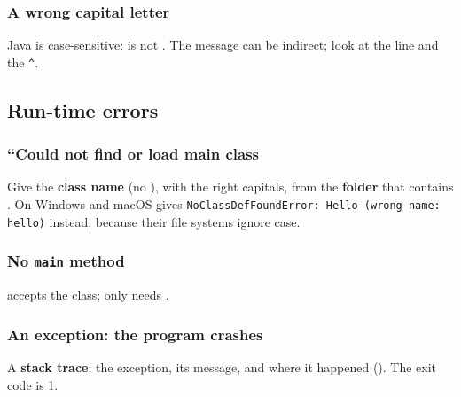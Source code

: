 \documentclass[aspectratio=169,10pt,compress]{beamer}
\begin{document}
\begin{frame}[t,fragile] \frametitle{A wrong capital letter}

  \vspace{0.2em}
  \small Java is case-sensitive:  is not . The message can be indirect; look at the
  line and the \texttt{\textasciicircum}.
\end{frame}

\subsection[Run]{Run-time errors}




\begin{frame}[t,fragile] \frametitle{``Could not find or load main class}

  \vspace{0.2em}
  \small Give the \textbf{class name} (no ), with the right capitals, from the \textbf{folder} that contains
  . On Windows and macOS  
  gives \texttt{NoClassDefFoundError: Hello (wrong name: hello)} instead,
  because their file systems ignore case.
\end{frame}




\begin{frame}[t,fragile] \frametitle{No \texttt{main} method}

  \vspace{0.2em}
  \small {} accepts the class; only  needs .
\end{frame}




\begin{frame}[t,fragile] \frametitle{An exception: the program crashes}

  \vspace{0.2em}
  \small A \textbf{stack trace}: the exception, its message, and where it happened (). The exit code is 1.
\end{frame}
\end{document}
